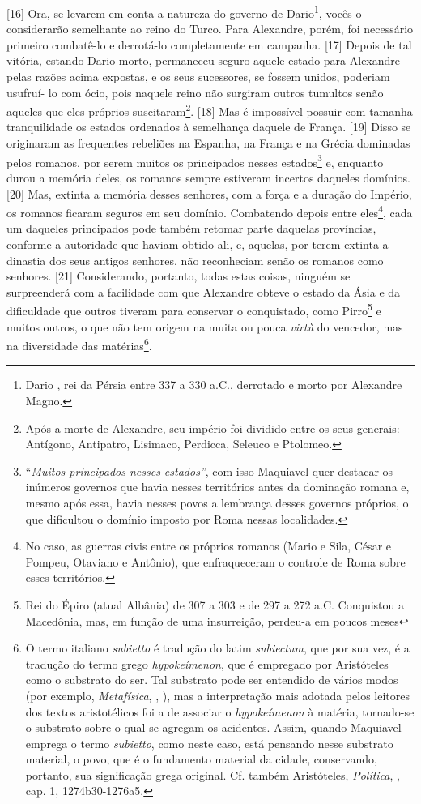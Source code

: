 {[}16{]} Ora, se levarem em conta a natureza do governo de
Dario\footnote{Dario , rei da Pérsia entre 337 a 330 a.C., derrotado
  e morto por Alexandre Magno.}, vocês o considerarão semelhante ao
reino do Turco. Para Alexandre, porém, foi necessário primeiro
combatê-lo e derrotá-lo completamente em campanha. {[}17{]} Depois de
tal vitória, estando Dario morto, permaneceu seguro aquele estado para
Alexandre pelas razões acima expostas, e os seus sucessores, se fossem
unidos, poderiam usufruí- lo com ócio, pois naquele reino não surgiram
outros tumultos senão aqueles que eles próprios suscitaram\footnote{Após
  a morte de Alexandre, seu império foi dividido entre os seus generais:
  Antígono, Antipatro, Lisimaco, Perdicca, Seleuco e Ptolomeo.}.
{[}18{]} Mas é impossível possuir com tamanha tranquilidade os estados
ordenados à semelhança daquele de França. {[}19{]} Disso se originaram
as frequentes rebeliões na Espanha, na França e na Grécia dominadas
pelos romanos, por serem muitos os principados nesses estados\footnote{``\emph{Muitos
  principados nesses estados''}, com isso Maquiavel quer destacar os
  inúmeros governos que havia nesses territórios antes da dominação
  romana e, mesmo após essa, havia nesses povos a lembrança desses
  governos próprios, o que dificultou o domínio imposto por Roma nessas
  localidades.} e, enquanto durou a memória deles, os romanos sempre
estiveram incertos daqueles domínios. {[}20{]} Mas, extinta a memória
desses senhores, com a força e a duração do Império, os romanos ficaram
seguros em seu domínio. Combatendo depois entre eles\footnote{No caso,
  as guerras civis entre os próprios romanos (Mario e Sila, César e
  Pompeu, Otaviano e Antônio), que enfraqueceram o controle de Roma
  sobre esses territórios.}, cada um daqueles principados pode também
retomar parte daquelas províncias, conforme a autoridade que haviam
obtido ali, e, aquelas, por terem extinta a dinastia dos seus antigos
senhores, não reconheciam senão os romanos como senhores. {[}21{]}
Considerando, portanto, todas estas coisas, ninguém se surpreenderá com
a facilidade com que Alexandre obteve o estado da Ásia e da dificuldade
que outros tiveram para conservar o conquistado, como Pirro\footnote{Rei
  do Épiro (atual Albânia) de 307 a 303 e de 297 a 272 a.C. Conquistou a
  Macedônia, mas, em função de uma insurreição, perdeu-a em poucos meses} e muitos outros,
o que não tem origem na muita ou pouca \emph{virtù} do vencedor, mas na
diversidade das matérias\footnote{O termo italiano \emph{subietto} é
  tradução do latim \emph{subiectum}, que por sua vez, é a tradução do
  termo grego \emph{hypokeímenon}, que é empregado por Aristóteles como
  o substrato do ser. Tal substrato pode ser entendido de vários modos
  (por exemplo, \emph{Metafísica}, , ), mas a interpretação mais
  adotada pelos leitores dos textos aristotélicos foi a de associar o
  \emph{hypokeímenon} à matéria, tornado-se o substrato sobre o qual se
  agregam os acidentes. Assim, quando Maquiavel emprega o termo
  \emph{subietto}, como neste caso, está pensando nesse substrato
  material, o povo, que é o fundamento material da cidade, conservando,
  portanto, sua significação grega original. Cf. também Aristóteles,
  \emph{Política}, , cap. 1, 1274b30-1276a5.}.

